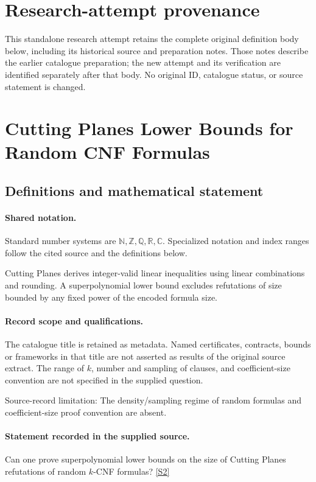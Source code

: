 \documentclass[11pt]{article}
\begin{document}
\section*{Research-attempt provenance}
This standalone research attempt retains the complete original definition body below,
including its historical source and preparation notes. Those notes describe the
earlier catalogue preparation; the new attempt and its verification are identified
separately after that body. No original ID, catalogue status, or source statement is changed.

\section{Cutting Planes Lower Bounds for Random CNF Formulas}\label{statement}

\subsection{Definitions and mathematical statement}

\paragraph{Shared notation.}Standard number systems are $\mathbb N,\mathbb Z,\mathbb Q,\mathbb R,\mathbb C$. Specialized notation and index ranges follow the cited source and the definitions below.


Cutting Planes derives integer-valid linear inequalities using linear combinations and rounding. A superpolynomial lower bound excludes refutations of size bounded by any fixed power of the encoded formula size.
\paragraph{Record scope and qualifications.}
The catalogue title is retained as metadata. Named certificates, contracts, bounds or frameworks in that title are not asserted as results of the original source extract.
The range of $k$, number and sampling of clauses, and coefficient-size convention are not specified in the supplied question.

Source-record limitation: The density/sampling regime of random formulas and coefficient-size proof convention are absent.
\paragraph{Statement recorded in the supplied source.}
Can one prove superpolynomial lower bounds on the size of Cutting Planes refutations of random $k$-CNF formulas? \href{https://doi.org/10.4171/owr/2017/37}{[S2]}
\end{document}
